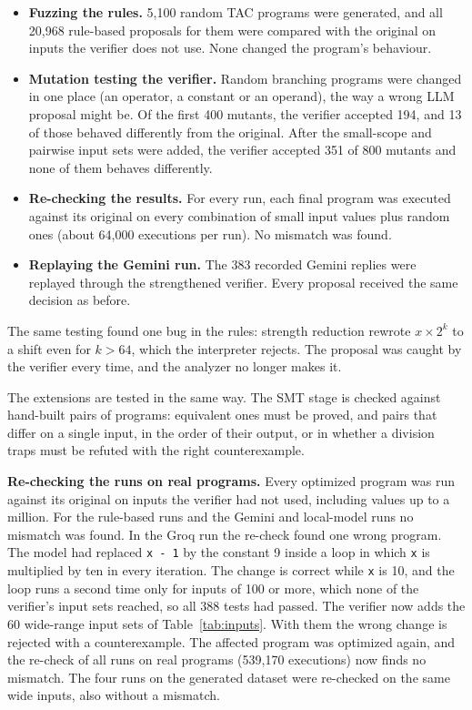 \documentclass[12pt,a4paper]{report}
\begin{document}
\begin{itemize}[leftmargin=2cm]
  \item \textbf{Fuzzing the rules.} 5,100 random TAC programs were generated, and all 20,968 rule-based proposals for them were compared with the original on inputs the verifier does not use. None changed the program's behaviour.
  \item \textbf{Mutation testing the verifier.} Random branching programs were changed in one place (an operator, a constant or an operand), the way a wrong LLM proposal might be. Of the first 400 mutants, the verifier accepted 194, and 13 of those behaved differently from the original. After the small-scope and pairwise input sets were added, the verifier accepted 351 of 800 mutants and none of them behaves differently.
  \item \textbf{Re-checking the results.} For every run, each final program was executed against its original on every combination of small input values plus random ones (about 64,000 executions per run). No mismatch was found.
  \item \textbf{Replaying the Gemini run.} The 383 recorded Gemini replies were replayed through the strengthened verifier. Every proposal received the same decision as before.
\end{itemize}

The same testing found one bug in the rules: strength reduction rewrote $x \times 2^k$ to a shift even for $k > 64$, which the interpreter rejects. The proposal was caught by the verifier every time, and the analyzer no longer makes it.

The extensions are tested in the same way. The SMT stage is checked against hand-built pairs of programs: equivalent ones must be proved, and pairs that differ on a single input, in the order of their output, or in whether a division traps must be refuted with the right counterexample.

\textbf{Re-checking the runs on real programs.} Every optimized program was run against its original on inputs the verifier had not used, including values up to a million. For the rule-based runs and the Gemini and local-model runs no mismatch was found. In the Groq run the re-check found one wrong program. The model had replaced \texttt{x - 1} by the constant 9 inside a loop in which \texttt{x} is multiplied by ten in every iteration. The change is correct while \texttt{x} is 10, and the loop runs a second time only for inputs of 100 or more, which none of the verifier's input sets reached, so all 388 tests had passed. The verifier now adds the 60 wide-range input sets of Table~\ref{tab:inputs}. With them the wrong change is rejected with a counterexample. The affected program was optimized again, and the re-check of all runs on real programs (539,170 executions) now finds no mismatch. The four runs on the generated dataset were re-checked on the same wide inputs, also without a mismatch.
\end{document}
